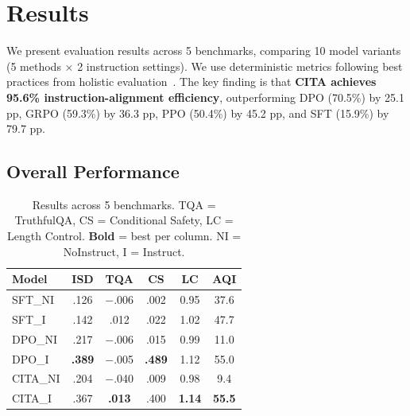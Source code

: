 
\vspace{-2mm}
\section{Results}
\label{sec:results}

We present evaluation results across 5 benchmarks, comparing 10 model variants (5 methods $\times$ 2 instruction settings). We use deterministic metrics following best practices from holistic evaluation~\cite{liang2023holistic,sun2024trustllm}. The key finding is that \textbf{CITA achieves 95.6\% instruction-alignment efficiency}, outperforming DPO (70.5\%) by 25.1 pp, GRPO (59.3\%) by 36.3 pp, PPO (50.4\%) by 45.2 pp, and SFT (15.9\%) by 79.7 pp.

\vspace{-2mm}
\subsection{Overall Performance}
\label{sec:overall_results}

\begin{table}[H]
\centering
\footnotesize
\begin{tabular}{@{}lccccc@{}}
\toprule
\textbf{Model} & \textbf{ISD} & \textbf{TQA} & \textbf{CS} & \textbf{LC} & \textbf{AQI} \\
\midrule
SFT\_NI & .126 & $-$.006 & .002 & 0.95 & 37.6 \\
\hline
SFT\_I & .142 & .012 & .022 & 1.02 & 47.7 \\
\hline
DPO\_NI & .217 & $-$.006 & .015 & 0.99 & 11.0 \\
\hline
DPO\_I & \textbf{.389} & $-$.005 & \textbf{.489} & 1.12 & 55.0 \\
\hline
CITA\_NI & .204 & $-$.040 & .009 & 0.98 & 9.4 \\
\hline
CITA\_I & .367 & \textbf{.013} & .400 & \textbf{1.14} & \textbf{55.5} \\
\bottomrule
\end{tabular}
\caption{Results across 5 benchmarks. TQA = TruthfulQA, CS = Conditional Safety, LC = Length Control. \textbf{Bold} = best per column. NI = NoInstruct, I = Instruct.}
\label{tab:overall_results}
\vspace{-4mm}
\end{table}

